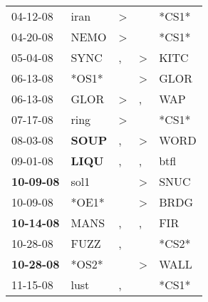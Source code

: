 \begin{supertabular}{p{0.07\textwidth}p{0.06\textwidth}p{0.02\textwidth}p{0.02\textwidth}p{0.06\textwidth}}
          04-12-08\textsuperscript{} &           iran\textsuperscript{} &     \textgreater &                  &                            *CS1* \\
          04-20-08\textsuperscript{} &           NEMO\textsuperscript{} &     \textgreater &                  &                            *CS1* \\
          05-04-08\textsuperscript{} &           SYNC\textsuperscript{} &                , &     \textgreater &           KITC\textsuperscript{} \\
          06-13-08\textsuperscript{} &                            *OS1* &                  &     \textgreater &           GLOR\textsuperscript{} \\
          06-13-08\textsuperscript{} &           GLOR\textsuperscript{} &     \textgreater &                , &            WAP\textsuperscript{} \\
          07-17-08\textsuperscript{} &           ring\textsuperscript{} &     \textgreater &                  &                            *CS1* \\
          08-03-08\textsuperscript{} &  \textbf{SOUP\textsuperscript{}} &                , &     \textgreater &           WORD\textsuperscript{} \\
          09-01-08\textsuperscript{} &  \textbf{LIQU\textsuperscript{}} &                , &                , &           btfl\textsuperscript{} \\
 \textbf{10-09-08\textsuperscript{}} &           sol1\textsuperscript{} &                  &     \textgreater &           SNUC\textsuperscript{} \\
          10-09-08\textsuperscript{} &                            *OE1* &                  &     \textgreater &           BRDG\textsuperscript{} \\
 \textbf{10-14-08\textsuperscript{}} &           MANS\textsuperscript{} &                , &                , &            FIR\textsuperscript{} \\
          10-28-08\textsuperscript{} &           FUZZ\textsuperscript{} &                , &                  &                            *CS2* \\
 \textbf{10-28-08\textsuperscript{}} &                            *OS2* &                  &     \textgreater &           WALL\textsuperscript{} \\
          11-15-08\textsuperscript{} &           lust\textsuperscript{} &                , &                  &                            *CS1* \\

\end{supertabular}
